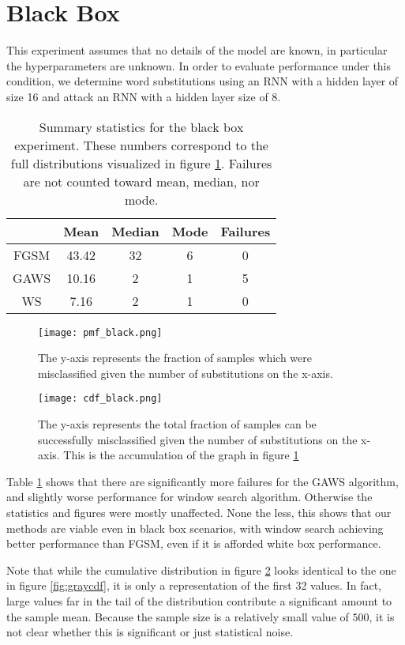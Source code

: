 \section{Black Box}
This experiment assumes that no details of the model are known, in particular the hyperparameters are unknown.  In order to evaluate performance under this condition, we determine word substitutions using an RNN with a hidden layer of size 16 and attack an RNN with a hidden layer size of 8.
\begin{table}
\centering
\begin{tabular}{ |c|c|c|c|c| } \hline
& Mean & Median & Mode & Failures\\ \hline
FGSM & 43.42 & 32 & 6 & 0\\ \hline
GAWS & 10.16 & 2 & 1 & 5\\ \hline
WS & 7.16 & 2 & 1 & 0\\ \hline
\end{tabular}
\caption{Summary statistics for the black box experiment.  These numbers correspond to the full distributions visualized in figure \ref{fig:blackpmf}.  Failures are not counted toward mean, median, nor mode.}
\label{tab:blacksum}
\end{table}
\begin{figure}
    \centering
    \texttt{[image: pmf\_black.png]}
    \caption{The y-axis represents the fraction of samples which were misclassified given the number of substitutions on the x-axis.}
    \label{fig:blackpmf}
\end{figure}

\begin{figure}
    \centering
    \texttt{[image: cdf\_black.png]}
    \caption{The y-axis represents the total fraction of samples can be successfully misclassified given the number of substitutions on the x-axis.  This is the accumulation of the graph in figure \ref{fig:blackpmf}}
    \label{fig:blackcdf}
\end{figure}

Table \ref{tab:blacksum} shows that there are significantly more failures for the GAWS algorithm, and slightly worse performance for window search algorithm.  Otherwise the statistics and figures were mostly unaffected.  None the less, this shows that our methods are viable even in black box scenarios, with window search achieving better performance than FGSM, even if it is afforded white box performance.

Note that while the cumulative distribution in figure \ref{fig:blackcdf} looks identical to the one in figure \ref{fig:graycdf}, it is only a representation of the first 32 values.  In fact, large values far in the tail of the distribution contribute a significant amount to the sample mean.  Because the sample size is a relatively small value of $500$, it is not clear whether this is significant or just statistical noise.
